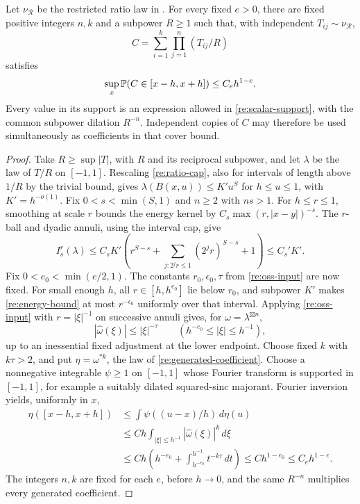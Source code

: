 \begin{lemma}\label{re:flat-coefficients}
Let \(\nu_{\mathcal R}\) be the restricted ratio law in
.  For every fixed \(e>0\), there are fixed
positive integers \(n,k\) and a subpower \(R\ge1\) such that, with
independent \(T_{ij}\sim\nu_{\mathcal R}\),
\begin{equation}\label{re:generated-coefficient}
 C=\sum_{i=1}^k\prod_{j=1}^n(T_{ij}/R)
\end{equation}
satisfies
\begin{equation}\label{re:coefficient-flatness}
 \sup_x\mathbb P(C\in[x-h,x+h])\le C_eh^{1-e}.
\end{equation}
Every value in its support is an expression allowed in
\eqref{re:scalar-support}, with the common subpower dilation
\(R^{-n}\).  Independent copies of \(C\) may therefore be used
simultaneously as coefficients in that cover bound.
\end{lemma}
\begin{proof}
Take \(R\ge\sup|T|\), with \(R\) and its reciprocal subpower, and
let \(\lambda\) be the law of \(T/R\) on \([-1,1]\).  Rescaling
\eqref{re:ratio-cap}, also for intervals of length above \(1/R\)
by the trivial bound, gives
\(\lambda(B(x,u))\le K' u^S\) for \(h\le u\le1\), with
\(K'=h^{-o(1)}\).  Fix \(0<s<\min(S,1)\) and \(n\ge2\) with \(ns>1\).
For \(h\le r\le1\), smoothing at scale \(r\) bounds the energy kernel
by \(C_s\max(r,|x-y|)^{-s}\).  The \(r\)-ball and dyadic annuli,
using the interval cap, give
\begin{equation}\label{re:energy-bound}
 I_s^r(\lambda)\le C_sK'
 \left(r^{S-s}+\sum_{j:2^jr\le1}(2^jr)^{S-s}+1\right)
 \le C_s'K'.
\end{equation}
Fix \(0<e_0<\min(e/2,1)\).  The constants \(r_0,\epsilon_0,\tau\)
from \eqref{re:oss-input} are now fixed.  For small enough \(h\),
all \(r\in[h,h^{e_0}]\) lie below \(r_0\), and subpower \(K'\)
makes \eqref{re:energy-bound} at most \(r^{-\epsilon_0}\)
uniformly over that interval.  Applying \eqref{re:oss-input} with
\(r=|\xi|^{-1}\) on successive annuli gives, for
\(\omega=\lambda^{\boxtimes n}\),
\[
 |\widehat\omega(\xi)|\le|\xi|^{-\tau}
 \qquad(h^{-e_0}\le|\xi|\le h^{-1}),
\]
up to an inessential fixed adjustment at the lower endpoint.
Choose fixed \(k\) with \(k\tau>2\), and put
\(\eta=\omega^{*k}\), the law of \eqref{re:generated-coefficient}.
Choose a nonnegative integrable \(\psi\ge1\) on \([-1,1]\) whose
Fourier transform is supported in \([-1,1]\), for example a suitably
dilated squared-sinc majorant.  Fourier inversion yields, uniformly
in \(x\),
\begin{align*}
 \eta([x-h,x+h])
 &\le \int\psi((u-x)/h)\,d\eta(u)\\
 &\le Ch\int_{|\xi|\le h^{-1}}|\widehat\omega(\xi)|^k\,d\xi\\
 &\le Ch\left(h^{-e_0}+
       \int_{h^{-e_0}}^{h^{-1}}t^{-k\tau}\,dt\right)
 \le Ch^{1-e_0}\le C_eh^{1-e}.
\end{align*}
The integers \(n,k\) are fixed for each \(e\), before \(h\to0\),
and the same \(R^{-n}\) multiplies every generated coefficient.
\end{proof}

